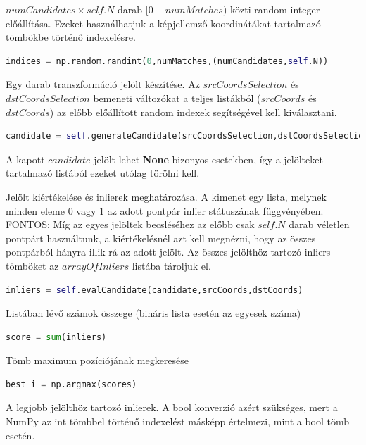 \documentclass[12pt,a4paper,oneside]{report}             %
\begin{document}
$numCandidates\times self.N$ darab $[0-numMatches)$ közti random integer előállítása. Ezeket használhatjuk a képjellemző koordinátákat tartalmazó tömbökbe történő indexelésre.

\begin{lstlisting}[language=Python]
indices = np.random.randint(0,numMatches,(numCandidates,self.N))
\end{lstlisting}

Egy darab transzformáció jelölt készítése. Az $srcCoordsSelection$ és $dstCoordsSelection$ bemeneti változókat a teljes listákból ($srcCoords$ és $dstCoords$) az előbb előállított random indexek segítségével kell kiválasztani.

\begin{lstlisting}[language=Python]
candidate = self.generateCandidate(srcCoordsSelection,dstCoordsSelection)
\end{lstlisting}

A kapott $candidate$ jelölt lehet \textbf{None} bizonyos esetekben, így a jelölteket tartalmazó listából ezeket utólag törölni kell.

Jelölt kiértékelése és inlierek meghatározása. A kimenet egy lista, melynek minden eleme $0$ vagy $1$ az adott pontpár inlier státuszának függvényében. FONTOS: Míg az egyes jelöltek becsléséhez az előbb csak $self.N$ darab véletlen pontpárt használtunk, a kiértékelésnél azt kell megnézni, hogy az összes pontpárból hányra illik rá az adott jelölt. Az összes jelölthöz tartozó inliers tömböket az $arrayOfInliers$ listába tároljuk el.

\begin{lstlisting}[language=Python]
inliers = self.evalCandidate(candidate,srcCoords,dstCoords)
\end{lstlisting}

Listában lévő számok összege (bináris lista esetén az egyesek száma)

\begin{lstlisting}[language=Python]
score = sum(inliers)
\end{lstlisting}

Tömb maximum pozíciójának megkeresése

\begin{lstlisting}[language=Python]
best_i = np.argmax(scores)
\end{lstlisting}

A legjobb jelölthöz tartozó inlierek. A bool konverzió azért szükséges, mert a NumPy az int tömbbel történő indexelést másképp értelmezi, mint a bool tömb esetén.
\end{document}
